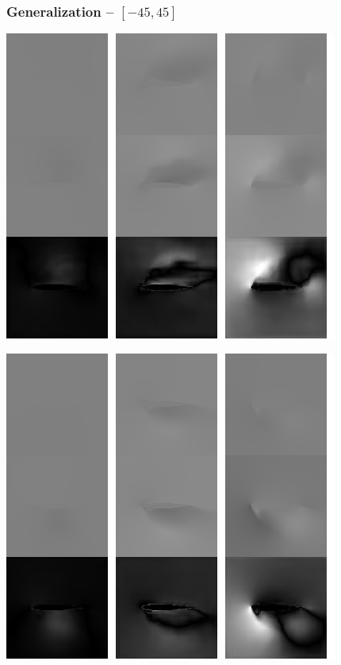 \begin{frame}
    \frametitle{Generalization -- $[-45, 45]$}
    \vspace*{.1cm}
\begin{multicols}{2}
	
	\includegraphics[width=.9\columnwidth, height=.6\textheight]{./Ressourcen/Praesentation/Bilder/TransferEval/45/0088_bw.png}%
    \vfill\columnbreak
    
    \includegraphics[width=.9\columnwidth, height=.6\textheight]{./Ressourcen/Praesentation/Bilder/TransferEval/45/0089_bw.png}%
\end{multicols}
    
\end{frame}
\clearpage

